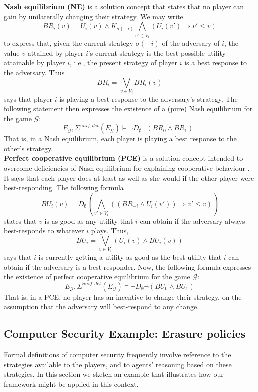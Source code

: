 \documentclass[a4wide]{article}
\theoremstyle{examplesty}
\newcommand{\strat}{\sigma}
\newcommand{\rimp}{\Rightarrow}
\newcommand{\Env}{E}
\newcommand{\detstrat}{\mathit{det}}
\newcommand{\unif}{\mathit{unif}}
\newcommand{\Strat}{\Sigma}
\begin{document}
\noindent 
{\bf Nash equilibrium (NE)}   is a solution concept  that states 
that 
no player can gain by unilaterally changing their strategy.
We may write $$BR_i(v) =  U_i(v)\land K_{\strat(-i)}\bigwedge_{v'\in V_{i}}(U_{i}(v')\rimp 
v'\leq v)$$
to express that, given the current 
strategy $\strat(-i)$ of the adversary of $i$, 
the value $v$ attained by player $i$'s current strategy is the best possible utility attainable by player $i$, 
i.e., the present strategy of player $i$ is a best response to the adversary.  
Thus $$BR_i = \bigvee_{v\in V_i} BR_i(v)$$ says that player $i$ 
 is playing a best-response to the adversary's strategy. 
The following statement then expresses the existence of a 
(pure)  
Nash equilibrium 
for the game $\mathcal{ G}$:
$$\Env_\mathcal{ G}, \Strat^{\unif, \detstrat}(\Env_\mathcal{ G})\models  \neg D_\emptyset \neg (BR_0\land BR_1)~.$$
That is, in a Nash equilibrium, each player is playing a best response to the other's strategy. \\ 

\noindent 
{\bf Perfect cooperative equilibrium (PCE)} 
is a solution concept intended to overcome deficiencies of Nash equilibrium for explaining cooperative behaviour \cite{HR2010}. 
It says that each player does at least as well as she would if the other player were best-responding.  The following formula
$$BU_i(v) =  D_\emptyset \left( \bigwedge_{v'\in V_i}((BR_{-i} \land U_i(v')) \rimp 
v'\leq v)\right)$$
states that $v$ is as good as any utility that $i$ can obtain if the adversary always best-responds to whatever $i$ plays. 
Thus,  
$$BU_i =  \bigvee_{v\in V_i} (U_i(v) \land BU_i(v))$$ 
says that $i$ is currently getting a utility as good 
as 
the best utility that 
$i$ 
can obtain if the adversary is a best-responder. 
Now, the following formula expresses the existence of perfect cooperative  equilibrium  for the game $\mathcal{ G}$: 
$$\Env_\mathcal{ G}, \Strat^{\unif, \detstrat}(\Env_\mathcal{ G})
\models \neg D_\emptyset \neg ( BU_0 \land BU_1 )$$ 
That is, in a PCE, no player has an incentive to change their strategy, on the assumption that the 
adversary will best-respond to any change. 

 

\subsection{Computer Security Example: Erasure policies} \label{sec:erasure}

Formal definitions of computer security frequently involve reference to 
the strategies available to the players, and to 
agents' reasoning based on these
strategies. In this section we sketch an example that illustrates 
how our framework might be applied in this context. 
\end{document}
